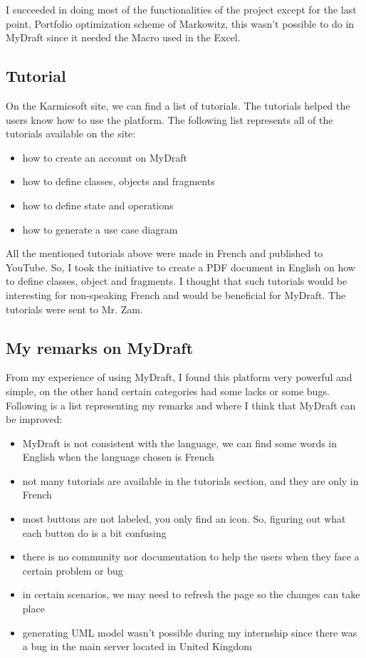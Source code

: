 \documentclass{report}
\begin{document}
I succeeded in doing most of the functionalities of the project except for the last point, Portfolio optimization scheme of Markowitz, this wasn't possible to do in MyDraft since it needed the Macro used in the Excel.\\

\subsection{Tutorial}
On the Karmicsoft site, we can find a list of tutorials. The tutorials helped the users know how to use the platform. The following list represents all of the tutorials available on the site: 
\begin{itemize}
\item how to create an account on MyDraft 
\item how to define classes, objects and fragments
\item how to define state and operations
\item how to generate a use case diagram
\end{itemize}

All the mentioned tutorials above were made in French and published to YouTube. So, I took the initiative to create a PDF document in English on how to define classes, object and fragments. I thought that such tutorials would be interesting for non-speaking French and would be beneficial for MyDraft. The tutorials were sent to Mr. Zam.

\subsection{My remarks on MyDraft}
From my experience of using MyDraft, I found this platform very powerful and simple, on the other hand certain categories had some lacks or some bugs. Following is a list representing my remarks and where I think that MyDraft can be improved:
\begin{itemize}
\item MyDraft is not consistent with the language, we can find some words in English when the language chosen is French
\item not many tutorials are available in the tutorials section, and they are only in French
\item most buttons are not labeled, you only find an icon. So, figuring out what each button do is a bit confusing
\item there is no community nor documentation to help the users when they face a certain problem or bug
\item in certain scenarios, we may need to refresh the page so the changes can take place
\item generating UML model wasn't possible during my internship since there was a bug in the main server located in United Kingdom
\end{itemize}
\end{document}
